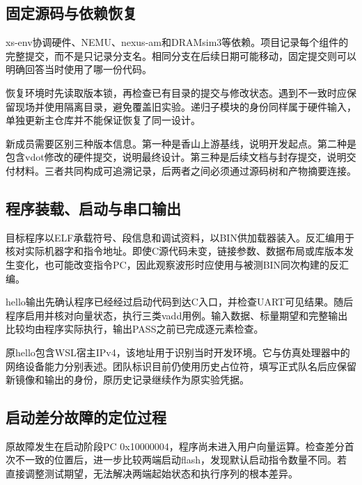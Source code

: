 \subsection{固定源码与依赖恢复}


xs-env协调硬件、NEMU、nexus-am和DRAMsim3等依赖。项目记录每个组件的完整提交，而不是只记录分支名。相同分支在后续日期可能移动，固定提交则可以明确回答当时使用了哪一份代码。\par


恢复环境时先读取版本锁，再检查已有目录的提交与修改状态。遇到不一致时应保留现场并使用隔离目录，避免覆盖旧实验。递归子模块的身份同样属于硬件输入，单独更新主仓库并不能保证恢复了同一设计。\par


新成员需要区别三种版本信息。第一种是香山上游基线，说明开发起点。第二种是包含vdot修改的硬件提交，说明最终设计。第三种是后续文档与封存提交，说明交付材料。三者共同构成可追溯记录，后两者之间必须通过源码树和产物摘要连接。\par


\subsection{程序装载、启动与串口输出}


目标程序以ELF承载符号、段信息和调试资料，以BIN供加载器装入。反汇编用于核对实际机器字和指令地址。即使C源代码未变，链接参数、数据布局或库版本发生变化，也可能改变指令PC，因此观察波形时应使用与被测BIN同次构建的反汇编。\par


hello输出先确认程序已经经过启动代码到达C入口，并检查UART可见结果。随后程序启用并核对向量状态，执行三类vadd用例。输入数据、标量期望和完整输出比较均由程序实际执行，输出PASS之前已完成逐元素检查。\par


原hello包含WSL宿主IPv4，该地址用于识别当时开发环境。它与仿真处理器中的网络设备能力分别表述。团队标识目前仍使用历史占位符，填写正式队名后应保留新镜像和输出的身份，原历史记录继续作为原实验凭据。\par


\subsection{启动差分故障的定位过程}


原故障发生在启动阶段PC 0x10000004，程序尚未进入用户向量运算。检查差分首次不一致的位置后，进一步比较两端启动flash，发现默认启动指令数量不同。若直接调整测试期望，无法解决两端起始状态和执行序列的根本差异。\par


